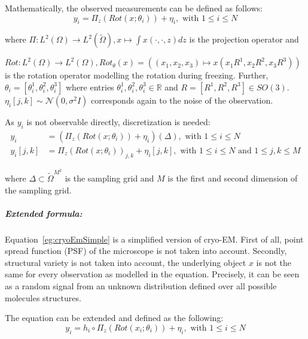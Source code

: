 Mathematically, the observed measurements can be defined as follows:
\begin{equation}
    \label{eq:cryoEmSimple}
    y_i = \Pi_z ( Rot (x; \theta_i)) + \eta_i, \text{ with } 1 \leq i \leq N
\end{equation}

where $\Pi : L^2(\Omega) \to L^2(\tilde{\Omega}), x \mapsto  \int x(\cdot,\cdot,z) dz$ is the projection operator
and 

$Rot : L^2(\Omega) \to L^2(\Omega), Rot_\theta(x) = \left((x_1,x_2,x_3) \mapsto x( x_1R^1, x_2R^2, x_3R^3)\right)$ is the rotation operator modelling the rotation during freezing.
Further, $\theta_i = [\theta_i^1, \theta_i^2, \theta_i^3 ] $ where entries $ \theta_i^1, \theta_i^2, \theta_i^3 \in \mathbb{R}$ and 
$R = [R^1, R^2, R^3] \in SO(3)$. $\eta_i[j,k] \sim \mathcal{N}(0,\sigma^2I)$ corresponds again to the noise of the observation.


As $y_i$ is not observable directly, discretization is needed:
\begin{equation}
    \label{eq:cryoEmSimpleDiscrete}
    \begin{aligned}
        y_i &= \left( \Pi_z ( Rot (x; \theta_i)) + \eta_i\right)(\Delta), \text{ with } 1 \leq i \leq N \\
        y_i[j,k] &= \Pi_z ( Rot(x; \theta_i))_{j,k} + \eta_i[j,k], \text{ with } 1 \leq i \leq N \text{ and } 1 \leq j,k \leq M    
    \end{aligned}
\end{equation}

where $\Delta \subset \tilde{\Omega}^{M^2}$ is the sampling grid and $M$ is the first and second dimension of the sampling grid.


\subparagraph{Extended formula:} 
Equation~\ref{eg:cryoEmSimple} is a simplified version of cryo-EM.
First of all, point spread function (PSF) of the microscope is not taken into account.
Secondly, structural variety is not taken into account, the underlying object $x$ is not the same 
for every observation as modelled in the equation. 
Precisely, it can be seen as a random signal from an unknown distribution defined over all possible molecules structures.

The equation can be extended and defined as the following:
\begin{equation}
    \label{eq:cryoEmExtended}
    y_i = h_i \circ \Pi_z ( Rot (x_i; \theta_i)) + \eta_i, \text{ with } 1 \leq i \leq N
\end{equation}

